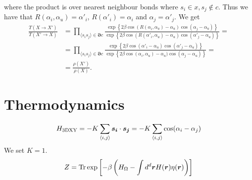 where the product is over nearest neighbour bonds where $s_i \in x, s_j \notin c$.
Thus we have that $ R(\alpha_i,\alpha_u) = \alpha'_i $, $R(\alpha'_i) = \alpha_i$ and $\alpha_j = \alpha'_j$.
We get
\begin{align}
  \frac{T(X\rightarrow X')}{T(X'\rightarrow X)}&= \prod_{\langle s_i s_j \rangle \in \bm{\partial} c} \frac{ \exp\left\{2\beta\cos(R(\alpha_i,\alpha_u) - \alpha_u)\cos(\alpha_j - \alpha_u)\right\}}{ \exp\left\{2\beta\cos(R(\alpha'_i,\alpha_u) - \alpha_u)\cos(\alpha'_j -\alpha_u)\right\}} = \\
  &= \prod_{\langle s_i s_j \rangle \in \bm{\partial} c} \frac{ \exp\left\{2\beta\cos(\alpha'_i - \alpha_u)\cos(\alpha'_j - \alpha_u)\right\}}{ \exp\left\{2\beta\cos(\alpha_i,\alpha_u) - \alpha_u)\cos(\alpha_j -\alpha_u)\right\}} = \\
  &= \frac{\rho(X')}{\rho(X)}.
\end{align}

\section{Thermodynamics}
\begin{equation}
  H_{\textrm{3DXY}} = -K\sum\limits_{\langle i,j\rangle} \bm{s_i}\cdot\bm{s_j} = -K\sum\limits_{\langle i,j\rangle} \cos(\alpha_i - \alpha_j)
\end{equation}
We set $K=1$.
\begin{equation}
  Z = \textrm{Tr} \exp\left[-\beta \left( H_\Omega - \int d^d \bm{r} H(\bm{r})\eta(\bm{r})\right)\right]
\end{equation}
\begin{equation}
  \label{}
\end{equation}
